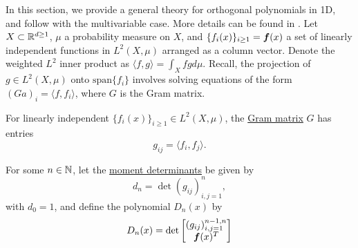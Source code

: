In this section, we provide a general theory for orthogonal polynomials in 1D, and follow with the multivariable case. More details can be found in \cite{dunkl_xu}. Let $X \subset \mathbb{R}^{d\geq 1}$, $\mu$ a probability measure on $X$, and $\{f_i(x)\}_{i\geq 1}=\boldsymbol{f}(x)$ a set of linearly independent functions in $L^2(X,\mu)$ arranged as a column vector. Denote the weighted $L^2$ inner product as $\langle f, g \rangle = \int_{X} fg d\mu$. Recall, the projection of $g \in L^2(X,\mu)$ onto $\text{span}\{f_i\}$ involves solving equations of the form $(Ga)_i = \langle f,f_i\rangle$, where $G$ is the Gram matrix.

\begin{definition}\normalfont
For linearly independent $\{f_i(x)\}_{i\geq 1} \in L^2(X,\mu)$, the \underline{Gram matrix} $G$ has entries
	$$g_{ij} = \langle f_i,f_j\rangle.$$
\end{definition}

\begin{definition}\label{def:moments}\normalfont
For some $n\in\mathbb{N}$, let the \underline{moment determinants} be given by
\begin{equation} 
d_n = \det{(g_{ij})_{i,j=1}^n},
\end{equation} 
with $d_0=1$, and define the polynomial $D_n(x)$ by
\begin{equation}
D_n(x) = \det{
	\begin{bmatrix} (g_{ij})_{i,j = 1}^{n-1,n} \\ \boldsymbol{f}(x)^T  \end{bmatrix}} 
\end{equation}
\end{definition}

